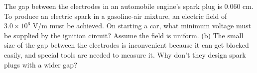        The gap between the electrodes in an automobile
        engine's spark plug is 0.060 cm.  To produce an electric
        spark in a gasoline-air mixture, an electric field of
        $3.0\times10^6$  V/m must be achieved.  On starting a car,
        what minimum voltage must be supplied by the ignition
        circuit? Assume the field is uniform.\answercheck\hwendpart
        (b) The small size
        of the gap between the electrodes is inconvenient because it
        can get blocked easily, and special tools are needed to
        measure it.  Why don't they design spark plugs with a wider gap?
